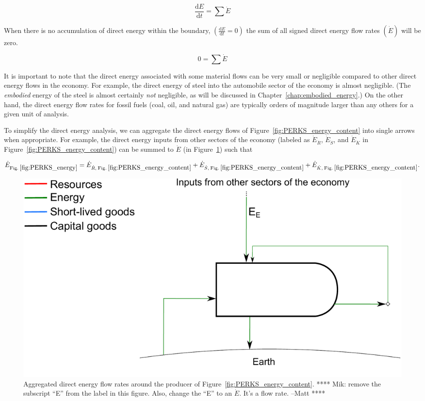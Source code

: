 \begin{equation} \label{eq:First_Law_with_accumulation}
	\frac{\mathrm{d}E}{\mathrm{d}t} = \sum \dot{E}
\end{equation}

When there is no accumulation of direct energy within the boundary,
$\left( \frac{\mathrm{d}E}{\mathrm{d}t} = 0 \right)$ the sum of all 
signed direct energy flow rates $\left( \dot{E} \right)$ will be zero.

\begin{equation} \label{eq:First_Law_no_accumulation}
	0 = \sum \dot{E}
\end{equation}

It is important to note that the direct energy associated with some material flows can
be very small or negligible compared to other direct energy flows in the economy.
For example, the direct energy of steel into the automobile sector of the economy 
is almost negligible. (The \emph{embodied} energy of the steel is almost certainly
\emph{not} negligible, as will be discussed in Chapter~\ref{chap:embodied_energy}.)
On the other hand, the direct energy flow rates for fossil fuels (coal, oil, and natural gas)
are typically orders of magnitude larger than any others for a given unit of analysis.

To simplify the direct energy analysis, 
we can aggregate the direct energy flows of Figure~\ref{fig:PERKS_energy_content}
into single arrows when appropriate. 
For example, the direct energy inputs from other sectors of the economy
(labeled as $\dot{E}_{\dot{R}}$, $\dot{E}_{\dot{S}}$, and $\dot{E}_{\dot{K}}$ 
in Figure~\ref{fig:PERKS_energy_content}) can be summed to $\dot{E}$ 
(in Figure~\ref{fig:PERKS_energy}) such that

\begin{equation} \label{eq:direct_energy_aggregation}
	\dot{E}_{\mathrm{Fig. \: \ref{fig:PERKS_energy}}} 
	= \dot{E}_{\dot{R}, \: \mathrm{Fig. \: \ref{fig:PERKS_energy_content}}} 
	+ \dot{E}_{\dot{S}, \: \mathrm{Fig. \: \ref{fig:PERKS_energy_content}}} 
	+ \dot{E}_{\dot{K}, \: \mathrm{Fig. \: \ref{fig:PERKS_energy_content}}}.
\end{equation}

\begin{figure}[h!]
\centering
\includegraphics[width=0.8\linewidth]{Part_2/Chapter_Energy/images/PERKS_basic_unit_energy.pdf}
\caption{Aggregated direct energy flow rates around 
the producer of Figure~\ref{fig:PERKS_energy_content}.
**** Mik: remove the subscript ``E'' from the label in this figure. Also, change the 
``E'' to an $\dot{E}$. It's a flow rate. --Matt ****}
\label{fig:PERKS_energy}
\end{figure}



